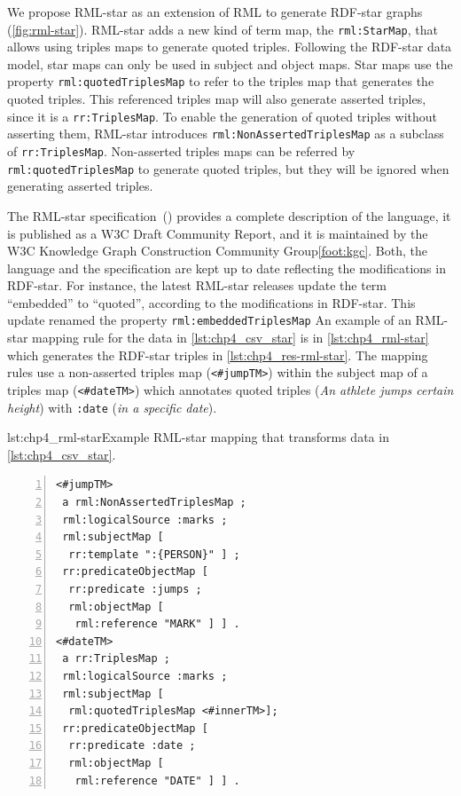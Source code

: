 We propose RML-star as an extension of RML to generate \mbox{RDF-star} graphs (\cref{fig:rml-star}). 
\mbox{RML-star} adds a new kind of term map, the \texttt{rml:StarMap}, that allows using triples maps to generate quoted triples. Following the \mbox{RDF-star} data model, star maps can only be used in subject and object maps. Star maps use the property \texttt{rml:quotedTri\-plesMap} to refer to the triples map that generates the quoted triples. This referenced triples map will also generate asserted triples, since it is a \texttt{rr:TriplesMap}. To enable the generation of quoted triples without asserting them, RML-star introduces \texttt{rml:NonAssertedTriplesMap} as a subclass of \texttt{rr:TriplesMap}. Non-asserted triples maps can be referred by \texttt{rml:quotedTriplesMap} to generate quoted triples, but they will be ignored when generating asserted triples.

The \mbox{RML-star} specification~(\cite{iglesias2022rmlstar}) provides a complete description of the language, it is published as a W3C Draft Community Report, and it is maintained by the W3C Knowledge Graph Construction Community Group\cref{foot:kgc}.
Both, the language and the specification are kept up to date reflecting the modifications in \mbox{RDF-star}.
For instance, the latest \mbox{RML-star} releases update the term ``embedded'' to ``quoted'',
according to the modifications in \mbox{RDF-star}.
This update renamed the property \texttt{rml:embeddedTriplesMap} 
An example of an \mbox{RML-star} mapping rule for the data in \cref{lst:chp4_csv_star} is in \cref{lst:chp4_rml-star} which generates the \mbox{RDF-star} triples in \cref{lst:chp4_res-rml-star}. 
The mapping rules use a non-asserted triples map (\texttt{<\#jumpTM>}) within the subject map of a triples map (\texttt{<\#dateTM>}) which annotates quoted triples (\textit{An athlete jumps certain height}) with \texttt{:date} (\textit{in a specific date}).



\begin{minipage}{\linewidth}
\centering
\begin{captionedlisting}{lst:chp4_rml-star}{Example RML-star mapping that transforms data in \cref{lst:chp4_csv_star}.}
\centering
\begin{multicols}{2}
{\begin{lstlisting}[numbers=left,basicstyle=\ttfamily\small,label={list:example1},columns=flexible,]
<#jumpTM> 
 a rml:NonAssertedTriplesMap ;
 rml:logicalSource :marks ;
 rml:subjectMap [ 
  rr:template ":{PERSON}" ] ;
 rr:predicateObjectMap [ 
  rr:predicate :jumps ;
  rml:objectMap [
   rml:reference "MARK" ] ] .
<#dateTM> 
 a rr:TriplesMap ;
 rml:logicalSource :marks ;
 rml:subjectMap [ 
  rml:quotedTriplesMap <#innerTM>];
 rr:predicateObjectMap [ 
  rr:predicate :date ;
  rml:objectMap [
   rml:reference "DATE" ] ] .
\end{lstlisting}}

\end{multicols}
\end{captionedlisting}
\end{minipage}


